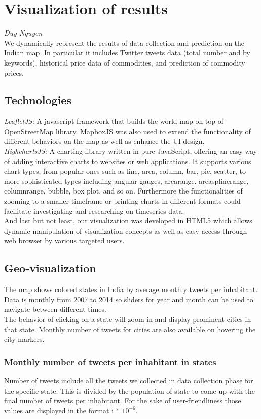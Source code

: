 \section*{Visualization of results}\emph{Duy Nguyen}
\\
We dynamically represent the results of data collection and prediction on the Indian map. In particular it includes Twitter tweets data (total number and by keywords), historical price data of commodities, and prediction of commodity prices.

\subsection*{Technologies}
\emph{LeafletJS:} A javascript framework that builds the world map on top of OpenStreetMap library. MapboxJS was also used to extend the functionality of different behaviors on the map as well as enhance the UI design.\\
\emph{HighchartsJS:} A charting library written in pure JavaScript, offering an easy way of adding interactive charts to websites or web applications. It supports various chart types, from popular ones such as line, area, column, bar, pie, scatter, to more sophisticated types including angular gauges, arearange, areasplinerange, columnrange, bubble, box plot, and so on. Furthermore the functionalities of zooming to a smaller timeframe or printing charts in different formats could facilitate investigating and researching on timeseries data.\\
And last but not least, our visualization was developed in HTML5 which allows dynamic manipulation of visualization concepts as well as easy access through web browser by various targeted users.

\subsection*{Geo-visualization}
The map shows colored states in India by average monthly tweets per inhabitant. Data is monthly from 2007 to 2014 so sliders for year and month can be used to navigate between different times.\\
The behavior of clicking on a state will zoom in and display prominent cities in that state. Monthly number of tweets for cities are also available on hovering the city markers.


\subsubsection*{Monthly number of tweets per inhabitant in states}
Number of tweets include all the tweets we collected in data collection phase for the specific state. This is divided by the population of state to come up with the final number of tweets per inhabitant. For the sake of user-friendliness those values are displayed in the format i * $10^{-6}$.



